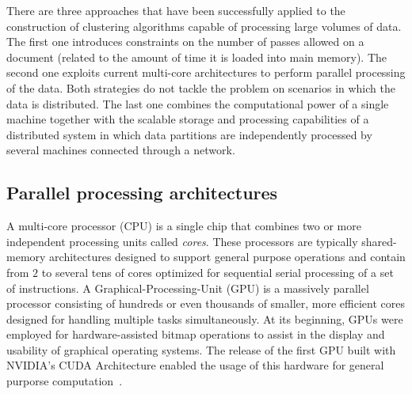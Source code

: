 \documentclass[10pt]{article}
\begin{document}
There are three approaches that have been successfully applied to the construction of clustering algorithms capable of processing large volumes of data. The first one introduces constraints on the number of passes allowed on a document (related to the amount of time it is loaded into main memory). The second one exploits current multi-core architectures to perform parallel processing of the data. Both strategies do not tackle the problem on scenarios in which the data is distributed.
The last one combines the computational power of a single machine together with the scalable storage and processing capabilities of a distributed system in which data partitions are independently processed by several machines connected through a network.

\subsection*{Parallel processing architectures}

A multi-core processor (CPU) is a single chip that combines two or more independent processing units called \textit{cores}.
These processors are typically shared-memory architectures designed to support general purpose operations and contain from $2$ to several tens of cores optimized for sequential serial processing of a set of instructions.
A Graphical-Processing-Unit (GPU) is a massively parallel processor consisting of hundreds or even thousands of smaller, more efficient cores designed for handling multiple tasks simultaneously. At its beginning, GPUs were employed for hardware-assisted bitmap operations to assist in the display and usability of graphical operating systems. The release of the first GPU built with NVIDIA's CUDA Architecture enabled the usage of this hardware for general purporse computation~\citep{SK10}.
\vspace{15pt}
\end{document}
